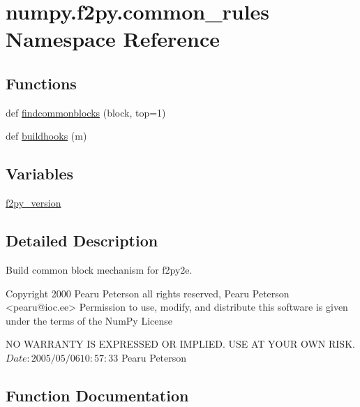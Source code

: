 \hypertarget{namespacenumpy_1_1f2py_1_1common__rules}{}\section{numpy.\+f2py.\+common\+\_\+rules Namespace Reference}
\label{namespacenumpy_1_1f2py_1_1common__rules}
\subsection*{Functions}
\begin{DoxyCompactItemize}
\item 
def \hyperlink{namespacenumpy_1_1f2py_1_1common__rules_a9413282968e76161d30387daf0bb6467}{findcommonblocks} (block, top=1)
\item 
def \hyperlink{namespacenumpy_1_1f2py_1_1common__rules_a97ebbeef104a975ccdb22a1c3632f9c8}{buildhooks} (m)
\end{DoxyCompactItemize}
\subsection*{Variables}
\begin{DoxyCompactItemize}
\item 
\hyperlink{namespacenumpy_1_1f2py_1_1common__rules_ad2628baabb78cb4dddb8673b7e2a906b}{f2py\+\_\+version}
\end{DoxyCompactItemize}


\subsection{Detailed Description}
\begin{DoxyVerb}Build common block mechanism for f2py2e.

Copyright 2000 Pearu Peterson all rights reserved,
Pearu Peterson <pearu@ioc.ee>
Permission to use, modify, and distribute this software is given under the
terms of the NumPy License

NO WARRANTY IS EXPRESSED OR IMPLIED.  USE AT YOUR OWN RISK.
$Date: 2005/05/06 10:57:33 $
Pearu Peterson\end{DoxyVerb}
 

\subsection{Function Documentation}
\mbox{\label{namespacenumpy_1_1f2py_1_1common__rules_a97ebbeef104a975ccdb22a1c3632f9c8}} 
